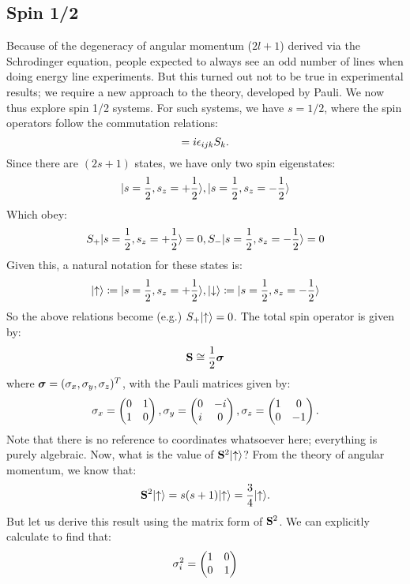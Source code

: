 \subsection{Spin 1/2}
Because of the degeneracy of angular momentum ($2l+1$) derived via the Schrodinger equation, people expected to always see an odd number of lines when doing energy line experiments. But this turned out not to be true in experimental results; we require a new approach to the theory, developed by Pauli. We now thus explore spin 1/2 systems. For such systems, we have $s = 1/2$, where the spin operators follow the commutation relations:
\begin{equation}
    [S_i, S_j] = i\e_{ijk}S_k.
\end{equation}
Since there are $(2s+1)$ states, we have only two spin eigenstates:
\begin{equation}
    \lvert s = \frac{1}{2}, s_z = +\frac{1}{2} \rangle, \lvert s = \frac{1}{2}, s_z = -\frac{1}{2} \rangle
\end{equation}
Which obey:
\begin{equation}
    S_+\lvert s = \frac{1}{2}, s_z = +\frac{1}{2} \rangle = 0,  S_-\lvert s = \frac{1}{2}, s_z = -\frac{1}{2} \rangle = 0
\end{equation}
Given this, a natural notation for these states is:
\begin{equation}
    \lvert \uparrow \rangle \coloneqq \lvert s = \frac{1}{2}, s_z = +\frac{1}{2} \rangle, \lvert \downarrow \rangle \coloneqq \lvert s = \frac{1}{2}, s_z = -\frac{1}{2} \rangle
\end{equation}
So the above relations become (e.g.) $S_+\lvert \uparrow \rangle = 0$. The total spin operator is given by:
\begin{equation}
    \mathbf{S} \cong \frac{1}{2}\mbox{\boldmath$ \sigma $}
\end{equation}
where $\mbox{\boldmath$ \sigma $} = (\sigma_x, \sigma_y, \sigma_z)^T$, with the Pauli matrices given by:
\begin{equation}
    \sigma_x = \begin{pmatrix} 0 & 1 \\ 1 & 0 \end{pmatrix}, \sigma_y = \begin{pmatrix} 0 & -i \\ i & 0 \end{pmatrix}, \sigma_z = \begin{pmatrix} 1 & 0 \\ 0 & -1 \end{pmatrix}.
\end{equation}
Note that there is no reference to coordinates whatsoever here; everything is purely algebraic. Now, what is the value of $\mathbf{S}^2\lvert \uparrow \rangle$? From the theory of angular momentum, we know that:
\begin{equation}
    \mathbf{S}^2\lvert \uparrow \rangle = s(s+1)\lvert \uparrow \rangle = \frac{3}{4}\lvert \uparrow \rangle.
\end{equation}
But let us derive this result using the matrix form of $\mathbf{S}^2$. We can explicitly calculate to find that:
\begin{equation}
    \sigma_i^2 = \begin{pmatrix} 1 & 0 \\ 0 & 1 \end{pmatrix}
\end{equation}
